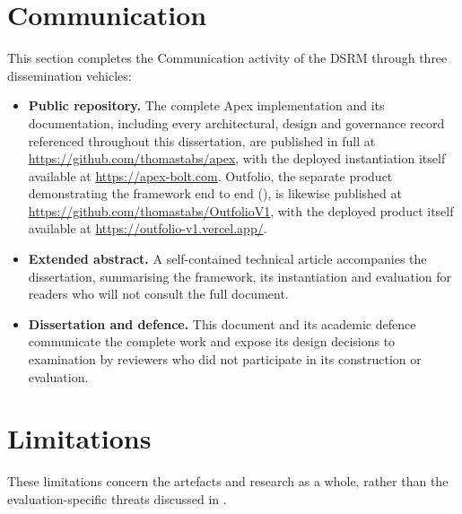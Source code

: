 \section{Communication}
\label{sec:communication}

This section completes the Communication activity of the \ac{DSRM} through three dissemination vehicles:

\begin{itemize}[leftmargin=0.6cm, itemsep=0.35em, topsep=0.2em]

\item \textbf{Public repository.} The complete Apex implementation and its documentation, including every architectural, design and governance record referenced throughout this dissertation, are published in full at \url{https://github.com/thomastabs/apex}, with the deployed instantiation itself available at \url{https://apex-bolt.com}. Outfolio, the separate product demonstrating the framework end to end (), is likewise published at \url{https://github.com/thomastabs/OutfolioV1}, with the deployed product itself available at \url{https://outfolio-v1.vercel.app/}.

\item \textbf{Extended abstract.} A self-contained technical article accompanies the dissertation, summarising the framework, its instantiation and evaluation for readers who will not consult the full document.

\item \textbf{Dissertation and defence.} This document and its academic defence communicate the complete work and expose its design decisions to examination by reviewers who did not participate in its construction or evaluation.

\end{itemize}


\section{Limitations}
\label{sec:limitations}

These limitations concern the artefacts and research as a whole, rather than the evaluation-specific threats discussed in .

